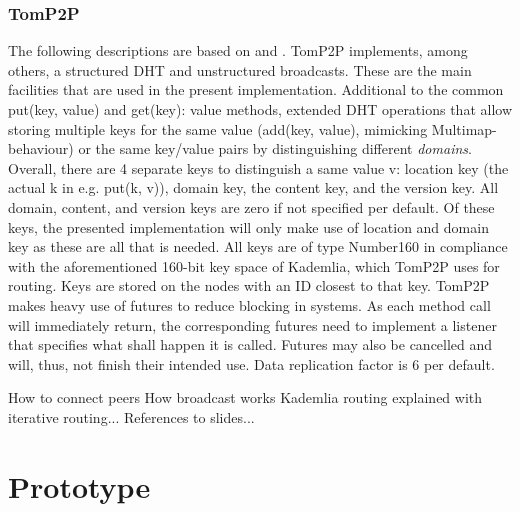 \subsubsection{TomP2P}
The following descriptions are based on \cite{BocekDHT} and \cite{TomP2P}. TomP2P implements, among others, a structured DHT and unstructured broadcasts. These are the main facilities that are used in the present implementation. Additional to the common put(key, value) and get(key): value methods, extended DHT operations that allow storing multiple keys for the same value (add(key, {value}), mimicking Multimap-behaviour) or the same key/value pairs by distinguishing different \textit{domains}. Overall, there are 4 separate keys to distinguish a same value v: location key (the actual k in e.g. put(k, v)), domain key, the content key, and the version key. All domain, content, and version keys are zero if not specified per default. Of these keys, the presented implementation will only make use of location and domain key as these are all that is needed. All keys are of type Number160 in compliance with the aforementioned 160-bit key space of Kademlia, which TomP2P uses for routing. Keys are stored on the nodes with an ID closest to that key. TomP2P makes heavy use of futures to reduce blocking in systems. As each method call will immediately return, the corresponding futures need to implement a listener that specifies what shall happen it is called. Futures may also be cancelled and will, thus, not finish their intended use. Data replication factor is 6 per default.

How to connect peers
How broadcast works
Kademlia routing explained with iterative routing...
References to slides...
\section{Prototype}
